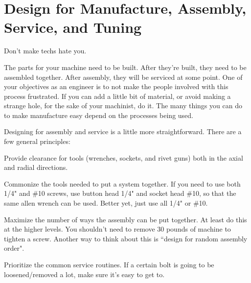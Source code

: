 \section{Design for Manufacture, Assembly, Service, and Tuning}

\begin{theorem}
	Don't make techs hate you.
\end{theorem}

The parts for your machine need to be built. After they're built, they need to be assembled together. After assembly, they will be serviced at some point. One of your objectives as an engineer is to not make the people involved with this process frustrated. If you can add a little bit of material, or avoid making a strange hole, for the sake of your machinist, do it. The many things you can do to make manufacture easy depend on the processes being used.

Designing for assembly and service is a little more straightforward. There are a few general principles:
\begin{asparaitem}
	\item Provide clearance for tools (wrenches, sockets, and rivet guns) both in the axial and radial directions.
	\item Commonize the tools needed to put a system together. If you need to use both 1/4" and \#10 screws, use button head 1/4" and socket head \#10, so that the same allen wrench can be used. Better yet, just use all 1/4" or \#10.
	\item Maximize the number of ways the assembly can be put together. At least do this at the higher levels. You shouldn't need to remove 30 pounds of machine to tighten a screw. Another way to think about this is ``design for random assembly order".
	\item Prioritize the common service routines. If a certain bolt is going to be loosened/removed a lot, make sure it's easy to get to.
\end{asparaitem}

